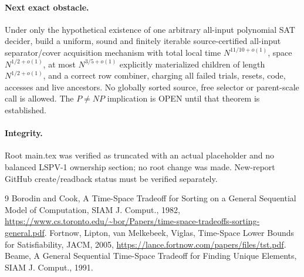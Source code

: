 \documentclass{article}
\begin{document}
\paragraph{Next exact obstacle.} Under only the hypothetical existence of one arbitrary all-input polynomial SAT decider, build a uniform, sound and finitely iterable source-certified all-input separator/cover acquisition mechanism with total local time $N^{11/10+o(1)}$, space $N^{1/2+o(1)}$, at most $N^{3/5+o(1)}$ explicitly materialized children of length $N^{1/2+o(1)}$, and a correct row combiner, charging all failed trials, resets, code, accesses and live ancestors. No globally sorted source, free selector or parent-scale call is allowed. The $P\ne NP$ implication is OPEN until that theorem is established.
\paragraph{Integrity.} Root main.tex was verified as truncated with an actual placeholder and no balanced LSPV-1 ownership section; no root change was made. New-report GitHub create/readback status must be verified separately.
\begin{thebibliography}{9}
 Borodin and Cook, A Time-Space Tradeoff for Sorting on a General Sequential Model of Computation, SIAM J. Comput., 1982, \url{https://www.cs.toronto.edu/~bor/Papers/time-space-tradeoffs-sorting-general.pdf}.
 Fortnow, Lipton, van Melkebeek, Viglas, Time-Space Lower Bounds for Satisfiability, JACM, 2005, \url{https://lance.fortnow.com/papers/files/tst.pdf}.
 Beame, A General Sequential Time-Space Tradeoff for Finding Unique Elements, SIAM J. Comput., 1991.
\end{thebibliography}
\end{document}
